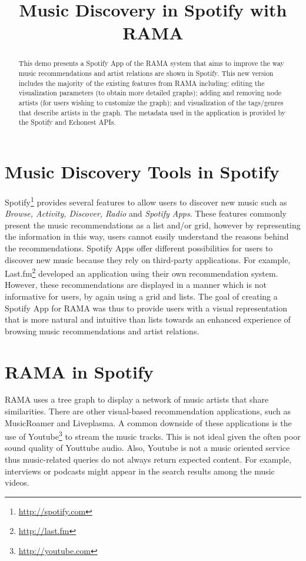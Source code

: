 \documentclass{article}
\title{Music Discovery in Spotify with RAMA}
\begin{document}
\maketitle

\begin{abstract}
  This demo presents a Spotify App of the RAMA system that aims to improve the way music recommendations and artist relations are shown in Spotify.  This new version includes the majority of the existing features from RAMA including: editing the visualization parameters (to obtain more detailed graphs); adding and removing node artists (for users wishing to customize the graph); and visualization of the tags/genres that describe artists in the graph.
  The metadata used in the application is provided by the Spotify and Echonest APIs.
\end{abstract}

  \section{Music Discovery Tools in Spotify}
  \label{sec:spotify_tools}

    Spotify\footnote{\url{http://spotify.com}} provides several features to allow users to discover new music such as \textit{Browse, Activity, Discover, Radio} and \textit{Spotify Apps}.
    These features commonly present the music recommendations as a list and/or grid, however by representing the information in this way, users cannot easily understand the reasons behind the recommendations. 
    Spotify Apps\cite{spotifyapps} offer different possibilities for users to discover new music because they rely on third-party applications. For example, Last.fm\footnote{\url{http://last.fm}} developed an application\cite{lastfmspotifyapp} using their own recommendation system.
    However, these recommendations are displayed in a manner which is not informative for users, by again using a grid and lists. 
    The goal of creating a Spotify App for RAMA\cite{Gouyon2011} was thus to provide users with a visual representation that is more natural and intuitive than lists towards an enhanced experience of browsing music recommendations and artist relations. 

  \section{RAMA in Spotify}
  \label{sec:rama}
    \sloppy
    RAMA uses a tree graph to display a network of music artists that share similarities.
    There are other visual-based recommendation applications, such as MusicRoamer\cite{musicroamer} and Liveplasma\cite{liveplasma}. A common downside of these applications is the use of Youtube\footnote{\url{http://youtube.com}} to stream the music tracks.
    This is not ideal given the often poor sound quality of Youttube audio. Also, Youtube is not a music oriented service thus music-related queries do not always return expected content. For example, interviews or podcasts might appear in the search results among the music videos.
\end{document}
